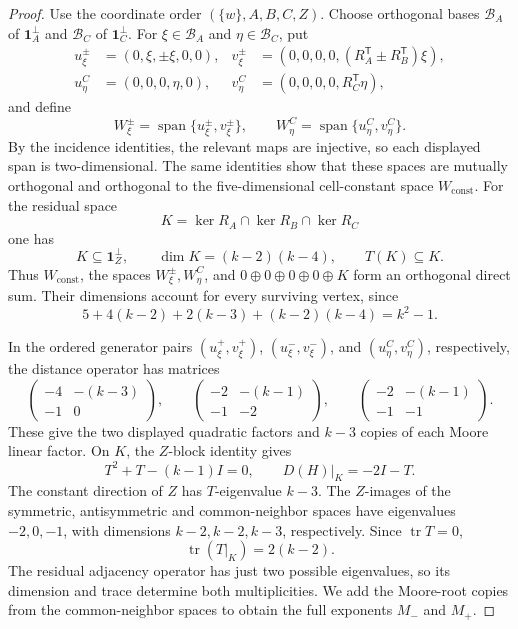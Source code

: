 \documentclass[a4paper,10pt,reqno]{amsart}
\theoremstyle{plain}
\theoremstyle{definition}
\theoremstyle{remark}
\newcommand{\one}{\mathbf 1}
\newcommand{\tr}{\operatorname{tr}}
\begin{document}
\begin{proof}
Use the coordinate order \((\{w\},A,B,C,Z)\).  Choose orthogonal bases
\(\mathcal B_A\) of \(\one_A^\perp\) and
\(\mathcal B_C\) of \(\one_C^\perp\).  For
\(\xi\in\mathcal B_A\) and \(\eta\in\mathcal B_C\), put
\[
\begin{aligned}
u_\xi^\pm&=(0,\xi,\pm\xi,0,0),&
v_\xi^\pm&=(0,0,0,0,
 (R_A^{\mathsf T}\pm R_B^{\mathsf T})\xi),\\
u_\eta^C&=(0,0,0,\eta,0),&
v_\eta^C&=(0,0,0,0,R_C^{\mathsf T}\eta),
\end{aligned}
\]
and define
\[
 W_\xi^\pm=\operatorname{span}\{u_\xi^\pm,v_\xi^\pm\},
 \qquad
 W_\eta^C=\operatorname{span}\{u_\eta^C,v_\eta^C\}.
\]
By the incidence identities, the relevant maps are injective, so each
displayed span is two-dimensional. The same identities show that these spaces are mutually
orthogonal and orthogonal to the five-dimensional cell-constant space
\(W_{\mathrm{const}}\).
For the residual space
\[
 K=\ker R_A\cap\ker R_B\cap\ker R_C
\]
one has
\[
 K\subseteq\one_Z^\perp,\qquad
 \dim K=(k-2)(k-4),\qquad T(K)\subseteq K.
\]
Thus \(W_{\mathrm{const}}\), the spaces \(W_\xi^\pm,W_\eta^C\), and
\(0\oplus0\oplus0\oplus0\oplus K\) form an orthogonal direct sum. Their
dimensions account for every surviving vertex, since
\[
 5+4(k-2)+2(k-3)+(k-2)(k-4)=k^2-1.
\]

In the ordered generator pairs
\((u_\xi^+,v_\xi^+)\), \((u_\xi^-,v_\xi^-)\), and
\((u_\eta^C,v_\eta^C)\), respectively, the distance operator has matrices
\[
 \begin{pmatrix}-4&-(k-3)\\-1&0\end{pmatrix},\qquad
 \begin{pmatrix}-2&-(k-1)\\-1&-2\end{pmatrix},\qquad
 \begin{pmatrix}-2&-(k-1)\\-1&-1\end{pmatrix}.
\]
These give the two displayed quadratic factors and \(k-3\) copies of
each Moore linear factor.  On \(K\), the \(Z\)-block identity gives
\[
 T^2+T-(k-1)I=0,
 \qquad D(H)|_K=-2I-T.
\]
The constant direction of \(Z\) has \(T\)-eigenvalue \(k-3\). The
\(Z\)-images of the symmetric, antisymmetric and common-neighbor spaces
have eigenvalues \(-2,0,-1\), with dimensions
\(k-2,k-2,k-3\), respectively.  Since \(\tr T=0\),
\[
 \tr(T|_K)=2(k-2).
\]
The residual adjacency operator has just two possible eigenvalues, so its
dimension and trace determine both multiplicities.  We add the Moore-root
copies from the common-neighbor spaces to obtain the full exponents
\(M_-\) and \(M_+\).


\end{proof}
\end{document}
